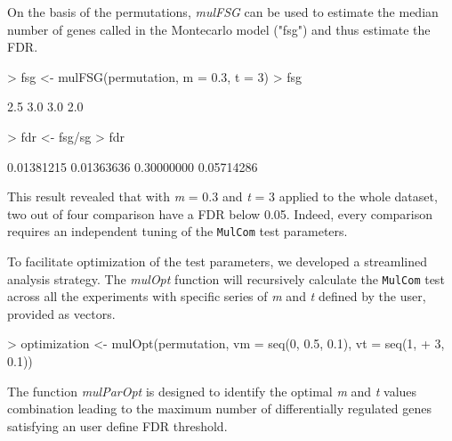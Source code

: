 \documentclass[a4paper]{article}
\begin{document}
\begin{Schunk}
\end{Schunk}

On the basis of the permutations, \emph{mulFSG} can be used to estimate the median number
of genes called in the Montecarlo model ("fsg") and thus estimate the FDR.

\begin{Schunk}
\begin{Sinput}
> fsg <- mulFSG(permutation, m = 0.3, t = 3)
> fsg
\end{Sinput}
\begin{Soutput}
[1] 2.5 3.0 3.0 2.0
\end{Soutput}
\begin{Sinput}
> fdr <- fsg/sg
> fdr
\end{Sinput}
\begin{Soutput}
[1] 0.01381215 0.01363636 0.30000000 0.05714286
\end{Soutput}
\end{Schunk}

This result revealed that with \emph{m} = 0.3 and \emph{t} = 3 applied to the whole dataset, two out of four comparison have a FDR below 0.05. 
Indeed, every comparison requires an independent tuning of the \texttt{MulCom} test parameters.

To facilitate optimization of the test parameters, we developed a streamlined analysis strategy.
The \emph{mulOpt} function will recursively calculate the \texttt{MulCom} test across all the experiments
with specific series of \emph{m} and \emph{t} defined by the user, provided as vectors.

\begin{Schunk}
\begin{Sinput}
> optimization <- mulOpt(permutation, vm = seq(0, 0.5, 0.1), vt = seq(1, 
+     3, 0.1))
\end{Sinput}
\end{Schunk}

The function \emph{mulParOpt} is designed to identify the optimal \emph{m} and 
\emph{t} values combination leading to the maximum number of differentially 
regulated genes satisfying an user define FDR threshold. 
\end{document}
